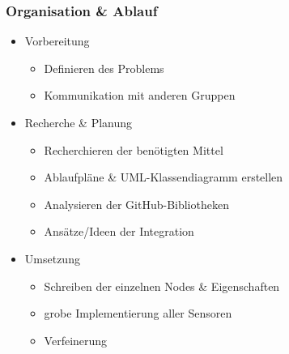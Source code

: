 \documentclass{beamer}
\begin{document}
\begin{frame}
\frametitle{Organisation \& Ablauf}
\begin{itemize}
\item<1-> Vorbereitung
\begin{itemize}
\item<2-3> Definieren des Problems
\item<3> Kommunikation mit anderen Gruppen
\end{itemize}
\item<4-> Recherche \& Planung
\begin{itemize}
\item<5-8> Recherchieren der benötigten Mittel
\item<6-8> Ablaufpläne \& UML-Klassendiagramm erstellen
\item<7-8> Analysieren der GitHub-Bibliotheken
\item<8> Ansätze/Ideen der Integration
\end{itemize}
 \item<9-> Umsetzung
\begin{itemize}
\item<10-12> Schreiben der einzelnen Nodes \& Eigenschaften
\item<11-12> grobe Implementierung aller Sensoren
\item<12> Verfeinerung
\end{itemize}
\end{itemize}
\end{frame}
\end{document}

